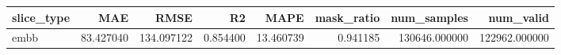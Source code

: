 \begin{tabular}{lrrrrrrr}
\toprule
slice_type & MAE & RMSE & R2 & MAPE & mask_ratio & num_samples & num_valid \\
\midrule
embb & 83.427040 & 134.097122 & 0.854400 & 13.460739 & 0.941185 & 130646.000000 & 122962.000000 \\
\bottomrule
\end{tabular}
